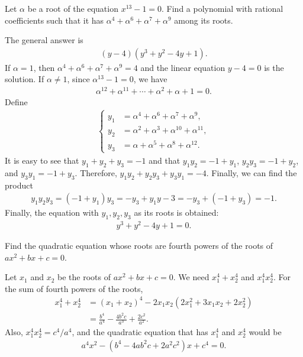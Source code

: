 \begin{question}
    Let $\alpha$ be a root of the equation $x^{13}-1=0$. Find a polynomial with rational coefficients such that it has $\alpha^4 + \alpha^6 + \alpha^7 + \alpha^9$ among its roots.
\end{question}

\begin{solution}
    The general answer is 
    \begin{align*}
        (y-4)(y^3+y^2-4y+1).
    \end{align*}
    If $\alpha=1$, then $\alpha^4 + \alpha^6 + \alpha^7 + \alpha^9=4$ and the linear equation $y-4=0$ is the solution. If $\alpha \neq 1$, since $\alpha^{13}-1=0$, we have
    \begin{align*}
        \alpha^{12} + \alpha^{11} + \cdots + \alpha^2 + \alpha + 1 = 0.
    \end{align*}
    Define
    \begin{align*}
        \begin{cases}
            y_1 &= \alpha^4 + \alpha^6 + \alpha^7 + \alpha^9,\\
            y_2 &= \alpha^2 + \alpha^3 + \alpha^{10} + \alpha^{11},\\
            y_3 &= \alpha + \alpha^5 + \alpha^8 + \alpha^{12}.
        \end{cases}
    \end{align*}
    It is easy to see that $y_1+y_2+y_3=-1$ and that $y_1y_2=-1+y_1$, $y_2y_3=-1+y_2$, and $y_3y_1=-1+y_3$. Therefore, $y_1y_2+y_2y_3+y_3y_1=-4$. Finally, we can find the product
    \begin{align*}
        y_1y_2y_3=(-1+y_1)y_3=-y_3+y_1y-3 = -y_3 + (-1+y_3) = -1.
    \end{align*}
    Finally, the equation with $y_1,y_2,y_3$ as its roots is obtained:
    \begin{align*}
        y^3+y^2-4y+1=0.
    \end{align*}
\end{solution}

\begin{question}
    Find the quadratic equation whose roots are fourth powers of the roots of $ax^2+bx+c=0$.
\end{question}

\begin{solution}
    Let $x_1$ and $x_2$ be the roots of $ax^2+bx+c=0$. We need $x_1^4+x_2^4$ and $x_1^4x_2^4$. For the sum of fourth powers of the roots,
    \begin{align*}
        x_1^4 + x_2^4 &= (x_1+x_2)^4 - 2x_1x_2(2x_1^2+3x_1x_2+2x_2^2)\\
        &= \frac{b^4}{a^4} - \frac{4b^2c}{a^3} + \frac{2c^2}{a^2}.
    \end{align*}
    Also, $x_1^4x_2^4=c^4/a^4$, and the quadratic equation that has $x_1^4$ and $x_2^4$ would be
    \begin{align*}
        a^4x^2 - (b^4-4ab^2c+2a^2c^2)x + c^4 = 0.
    \end{align*}
\end{solution}


